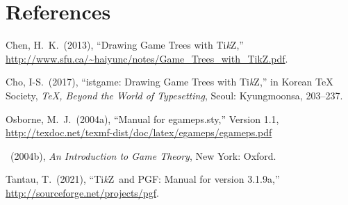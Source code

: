 \documentclass[a4paper,amsmath]{oblivoir}
\newcommand*\Tikz{Ti\textit{k}Z}
\let\TikZ\Tikz
\def\hpara{\hangpara{1.52em}{1}}
\newcommand\pkg[1]{\textsf{#1}}
\begin{document}
\section{References}
\hpara{}Chen, H.~K.~(2013), ``Drawing Game Trees with \TikZ,'' \url{http://www.sfu.ca/~haiyunc/notes/Game_Trees_with_TikZ.pdf}.

\hpara{}Cho, I-S.~(2017), ``\pkg{istgame}: Drawing Game Trees with \TikZ,'' in Korean TeX Society, \emph{\TeX, Beyond the World of Typesetting}, Seoul: Kyungmoonsa, 203--237.

\hpara{}Osborne, M.~J.~(2004a), ``Manual for \pkg{egameps.sty},'' Version 1.1, \url{http://texdoc.net/texmf-dist/doc/latex/egameps/egameps.pdf}

\hpara{}\uline{\hphantom{Osborne, M.~J}}~(2004b), \emph{An Introduction to Game Theory}, New York: Oxford.

\hpara{}Tantau, T.~(2021), ``\TikZ\ and PGF: Manual for version 3.1.9a,'' \url{http://sourceforge.net/projects/pgf}.

%
%
%
%
%
%

\clearpage
\printindex
\end{document}
